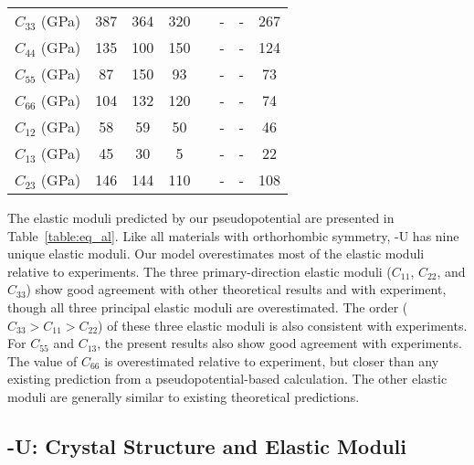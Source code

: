 \begin{table}
\begin{tabular}{cccccccc}
$C_{33}$ (GPa)		 & 387			 & 364			 & 320		  &&	-		&-		&267 \\
$C_{44}$ (GPa)		 & 135			 &100			 & 150		  &&	-		&-		&124 \\
$C_{55}$ (GPa)		 & 87			 & 150			 & 93		  &&	-		&-		&73 \\
$C_{66}$ (GPa)	     & 104			 & 132			 & 120		  &&	-		&-		&74\\
$C_{12}$ (GPa)		 & 58			 & 59			 & 50		  &&	-		&-		&46\\
$C_{13}$ (GPa)		 & 45			 & 30			 & 5		  &&	-		&-		&22\\
$C_{23}$ (GPa)		 & 146			 & 144			 & 110		  &&	-		&-		&108\\
  \hline
\end{tabular}
\end{table}

The elastic moduli predicted by our pseudopotential are
presented in Table~\ref{table:eq_al}. Like all materials with
orthorhombic symmetry, \textalpha-U has nine unique elastic
moduli. Our model overestimates most of the elastic moduli
relative to experiments. The three primary-direction elastic
moduli ($C_{11}$, $C_{22}$, and $C_{33}$) show good agreement
with other theoretical results and with experiment, though all
three principal elastic moduli are overestimated.
The order ($C_{33} > C_{11} > C_{22}$) of these three elastic
moduli is also consistent with experiments. For $C_{55}$ and
$C_{13}$, the present results also show good agreement with
experiments.  The value of $C_{66}$ is overestimated relative to
experiment, but closer than any existing prediction from a
pseudopotential-based calculation. The other elastic moduli are
generally similar to existing theoretical predictions.

\subsection{\textgamma-U: Crystal Structure and Elastic Moduli}
\label{subsec_gamma}

